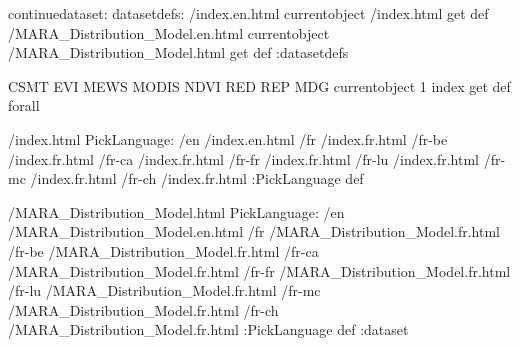\begin{ingrid}
continuedataset:
datasetdefs:
/index.en.html currentobject /index.html get def
/MARA_Distribution_Model.en.html currentobject /MARA_Distribution_Model.html get def
:datasetdefs

{ CSMT EVI MEWS MODIS NDVI RED REP MDG } { currentobject 1 index get def } forall

/index.html {
PickLanguage:
/en /index.en.html
/fr /index.fr.html
/fr-be /index.fr.html
/fr-ca /index.fr.html
/fr-fr /index.fr.html
/fr-lu /index.fr.html
/fr-mc /index.fr.html
/fr-ch /index.fr.html
:PickLanguage
} def

/MARA_Distribution_Model.html {
PickLanguage:
/en /MARA_Distribution_Model.en.html
/fr /MARA_Distribution_Model.fr.html
/fr-be /MARA_Distribution_Model.fr.html
/fr-ca /MARA_Distribution_Model.fr.html
/fr-fr /MARA_Distribution_Model.fr.html
/fr-lu /MARA_Distribution_Model.fr.html
/fr-mc /MARA_Distribution_Model.fr.html
/fr-ch /MARA_Distribution_Model.fr.html
:PickLanguage
} def
:dataset
\end{ingrid}
